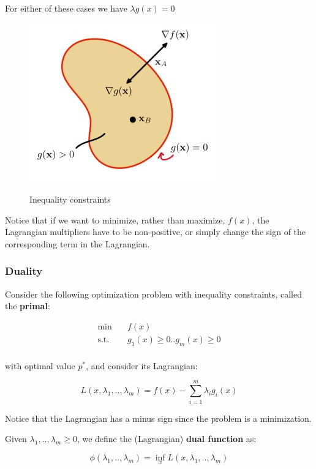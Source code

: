 For either of these cases we have $\lambda g(x) = 0$

\begin{figure}[h!]
		\centering
		\includegraphics[scale = 1.5]{img/inequality constraints intuition.jpg}
		\label{svm}
		\caption{Inequality constraints}
\end{figure}

Notice that if we want to minimize, rather than maximize, $f(x)$, the Lagrangian multipliers have to be non-positive, or simply change the sign of the corresponding term in the Lagrangian.

\subsubsection{Duality}
Consider the following optimization problem with inequality constraints, called the \textbf{primal}:

\begin{equation*}\label{duality}
\begin{aligned}
\min \quad & f(x)\\
\textrm{s.t.} \quad & g_1(x) \geq 0 .. g_m(x) \geq 0  \\
\end{aligned}
\end{equation*}

with optimal value $p^*$, and consider its Lagrangian:

$$
L(x, \lambda_1, .., \lambda_m) = f(x) - \sum_{i = 1}^m \lambda_i g_i(x)
$$

Notice that the Lagrangian has a minus sign since the problem is a minimization.

Given $\lambda_1, .., \lambda_m \geq 0$, we define the (Lagrangian) \textbf{dual function} as:

$$
\phi(\lambda_1, .., \lambda_m) = \inf_x L(x, \lambda_1, .., \lambda_m)
$$

